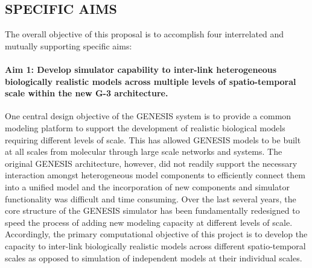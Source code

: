 \documentclass[12pt]{article}
\begin{document}
\newpage

\subsection*{SPECIFIC AIMS}
\noindent The overall objective of this proposal is to accomplish four interrelated and mutually supporting specific aims:

\paragraph{Aim 1: Develop simulator capability to inter-link heterogeneous biologically realistic models across multiple levels of spatio-temporal scale within the new G-3 architecture.} One central design objective of the GENESIS system is to provide a common modeling platform to support the development of realistic biological models requiring different levels of scale. This has allowed GENESIS models to be built at all scales from molecular through large scale networks and systems. The original GENESIS architecture, however, did not readily support the necessary interaction amongst heterogeneous model components to efficiently connect them into a unified model and the incorporation of new components and simulator functionality was difficult and time consuming. Over the last several years, the core structure of the GENESIS simulator has been fundamentally redesigned to speed the process of adding new modeling capacity at different levels of scale.
Accordingly, the primary computational objective of this project is to develop the capacity to inter-link biologically realistic models across different spatio-temporal scales as opposed to simulation of independent models at their individual scales.
\end{document}
